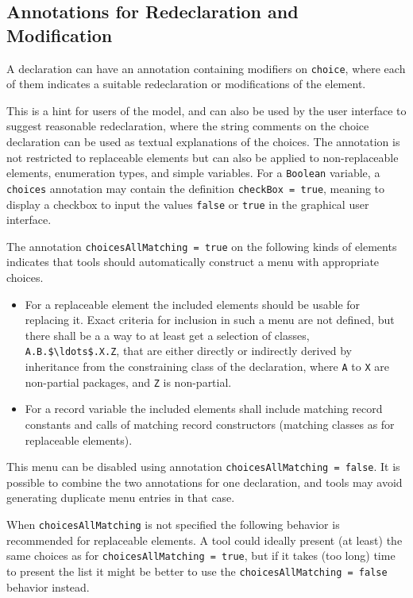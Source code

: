 \subsection{Annotations for Redeclaration and Modification}\label{annotation-choices-for-suggested-redeclarations-and-modifications}

A declaration can have an annotation  containing modifiers on \lstinline!choice!, where each of them indicates a suitable redeclaration or modifications of the element.

This is a hint for users of the model, and can also be used by the user interface to suggest reasonable redeclaration, where the string comments on the choice declaration can be used as textual explanations of the choices.
The annotation is not restricted to replaceable elements but can also be applied to non-replaceable elements, enumeration types, and simple variables.
For a \lstinline!Boolean! variable, a \lstinline!choices! annotation may contain the definition \lstinline!checkBox = true!, meaning to display a checkbox to input the values \lstinline!false! or \lstinline!true! in the graphical user interface.

The annotation \lstinline!choicesAllMatching = true! on the following kinds of elements indicates that tools should automatically construct a menu with appropriate choices.
\begin{itemize}
\item For a replaceable element the included elements should be usable for replacing it.
Exact criteria for inclusion in such a menu are not defined, but there shall be a a way to at least get a selection of classes, \lstinline!A.B.$\ldots$.X.Z!, that are either directly or indirectly derived by inheritance from the constraining class of the declaration, where \lstinline!A! to \lstinline!X! are non-partial packages, and \lstinline!Z! is non-partial.
\item For a record variable the included elements shall include matching record constants and calls of matching record constructors (matching classes as for replaceable elements).
\end{itemize}

This menu can be disabled using annotation \lstinline!choicesAllMatching = false!.
It is possible to combine the two annotations for one declaration, and tools may avoid generating duplicate menu entries in that case.
\begin{nonnormative}
When \lstinline!choicesAllMatching! is not specified the following behavior is recommended for replaceable elements.
A tool could ideally present (at least) the same choices as for \lstinline!choicesAllMatching = true!, but if it takes (too long) time to present the list it might be better to use the \lstinline!choicesAllMatching = false! behavior instead.
\end{nonnormative}

